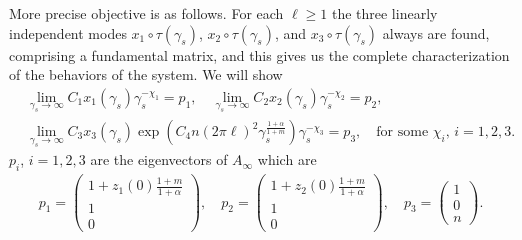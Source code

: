 \documentclass[a4paper,11pt]{article}
\def\l{(2\pi \ell)}
\theoremstyle{remark}
\begin{document}
More precise objective is as follows. For each $\ell\ge 1$ the three linearly independent modes $x_1\circ\tau(\gamma_s)$, $x_2\circ\tau(\gamma_s)$, and $x_3\circ\tau(\gamma_s)$ always are found, comprising a fundamental matrix, and this gives us the complete characterization of the behaviors of the system. We will show
\begin{equation}
\begin{aligned}
 &\lim_{\gamma_s \rightarrow \infty} C_1 x_1(\gamma_s) \gamma_s^{-\chi_1} = p_1, \quad \lim_{\gamma_s \rightarrow \infty} C_2x_2(\gamma_s)  \gamma_s^{-\chi_2} = p_2, \\
 &\lim_{\gamma_s \rightarrow \infty} C_3 x_3(\gamma_s) \exp\left(C_4n\l^2 \gamma_s^{\frac{1+\alpha}{1+m}}\right)\gamma_s^{-\chi_3} = p_3, \quad \text{for some $\chi_i$, $i=1,2,3$}.
 \end{aligned}
\end{equation}
$p_i$, $i=1,2,3$ are the eigenvectors of $A_\infty$ which are
\begin{align*}
  p_1=\begin{pmatrix} 1+z_1(0)\frac{1+m}{1+\alpha} \\ 1 \\  0 \end{pmatrix}, \quad 
  p_2 = \begin{pmatrix} 1+z_2(0)\frac{1+m}{1+\alpha} \\ 1  \\ 0 \end{pmatrix}, \quad 
  p_3 = \begin{pmatrix} 1 \\ 0 \\ n \end{pmatrix}.
 \end{align*} 
\end{document}
